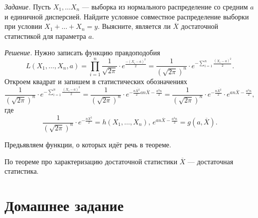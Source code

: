 \textit{Задание.}
Пусть $X_1, \dotsc X_n$ ---
выборка из нормального распределение со средним $a$ и единичной дисперсией.
Найдите условное совместное распределение выборки при условии $X_1 + \dotsc + X_n = y$.
Выясните, является ли $ \overline{X}$ достаточной статистикой для параметра $a$.

\textit{Решение.} Нужно записать функцию правдоподобия
$$L \left( X_1, \dotsc, X_n, a \right) =
  \prod \limits_{i = 1}^n \frac{1}{ \sqrt{2 \pi }} \cdot e^{ \frac{- \left( X_i - a \right)^2}{2}} =
  \frac{1}{ \left( \sqrt{2 \pi } \right)^n} \cdot
  e^{- \sum \limits_{i = 1}^n \frac{ \left( X_i - a \right)^2}{2}}.$$
Откроем квадрат и запишем в статистических обозначениях
$$ \frac{1}{ \left( \sqrt{2 \pi } \right)^n} \cdot
  e^{- \sum \limits_{i = 1}^n \frac{ \left( X_i - a \right)^2}{2}} =
  \frac{1}{ \left( \sqrt{2 \pi } \right)^n} \cdot
  e^{- \frac{n \overline{X^2}}{2} an \overline{X} - \frac{a^2 n}{2}} =
  \frac{1}{ \left( \sqrt{2 \pi } \right)^n} \cdot e^{- \frac{n \overline{X^2}}{2}} \cdot
  e^{an \overline{X} - \frac{a^2 n}{2}},$$
где
$$ \frac{1}{ \left( \sqrt{2 \pi } \right)^n} \cdot e^{- \frac{n \overline{X^2}}{2}} =
  h \left( X_1, \dotsc, X_n \right), \,
  e^{an \overline{X} - \frac{a^2 n}{2}} = g \left( a, \overline{X} \right).$$

Предьявляем функции, о которых идёт речь в теореме.

По теореме про характеризацию достаточной статистики $ \overline{X}$ --- достаточная статистика.

\section*{Домашнее задание}

